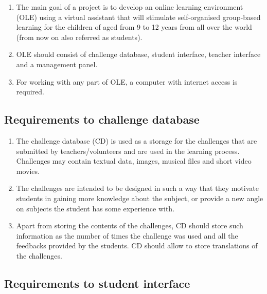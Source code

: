 \documentclass[a4paper]{article}
\begin{document}
\begin{enumerate}
\item The main goal of a project is to develop an online learning environment (OLE) using a virtual assistant that will stimulate self-organised group-based learning for the children of aged from 9 to 12 years from all over the world (from now on also referred as students).

\item OLE should consist of challenge database, student interface, teacher interface and a management panel.

\item For working with any part of OLE, a computer with internet access is required.
\end{enumerate}

\subsection{Requirements to challenge database}

\begin{enumerate}
\item The challenge database (CD) is used as a storage for the challenges that are submitted by teachers/volunteers and are used in the learning process. Challenges may contain textual data, images, musical files and short video movies.

\item The challenges are intended to be designed in such a way that they motivate students in gaining more knowledge about the subject, or provide a new angle on subjects the student has some experience with.

\item Apart from storing the contents of the challenges, CD should store such information as the number of times the challenge was used and all the feedbacks provided by the students. CD should allow to store translations of the challenges.
\end{enumerate}

\subsection{Requirements to student interface}
\end{document}
